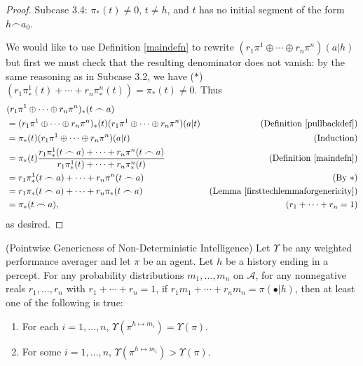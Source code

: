 \documentclass[runningheads]{llncs}
\begin{document}
\begin{proof}
    Subcase 3.4: $\pi_*(t)\not=0$, $t\not=h$, and $t$ has no initial segment
        of the form $h\frown a_0$.

    We would like to use Definition \ref{maindefn} to rewrite
    $(r_1\pi^1\oplus\cdots\oplus r_n\pi^n)(a|h)$ but first we must
    check that the resulting denominator does not vanish:
    by the same reasoning as in Subcase 3.2, we have
    ($*$) $(r_1\pi^1_*(t)+\cdots+r_n\pi^n_*(t))=\pi_*(t)\not=0$.
    Thus
    \begin{align*}
        &{} (r_1\pi^1\oplus\cdots\oplus r_n\pi^n)_*(t\frown a)\\
            &= (r_1\pi^1\oplus\cdots\oplus r_n\pi^n)_*(t)
                (r_1\pi^1\oplus\cdots\oplus r_n\pi^n)(a|t)
                    &\mbox{(Definition \ref{pullbackdef})}\\
            &= \pi_*(t)(r_1\pi^1\oplus\cdots\oplus r_n\pi^n)(a|t)
                    &\mbox{(Induction)}\\
            &= \pi_*(t)\frac{r_1\pi^1_*(t\frown a)+\cdots+r_n\pi^n(t\frown a)}
                {r_1\pi^1_*(t)+\cdots+r_n\pi^n_*(t)}
                    &\mbox{(Definition \ref{maindefn})}\\
            &= r_1\pi^1_*(t\frown a)+\cdots+r_n\pi^n(t\frown a)
                    &\mbox{(By $*$)}\\
            &= r_1\pi_*(t\frown a)+\cdots+r_n\pi_*(t\frown a)
                    &\mbox{(Lemma \ref{firsttechlemmaforgenericity})}\\
            &= \pi_*(t\frown a),
                    &\mbox{($r_1+\cdots+r_n=1$)}
    \end{align*}
    as desired.
\end{proof}

\begin{theorem}
\label{pointwisegenericnessthm}
    (Pointwise Genericness of Non-Deterministic Intelligence)
    Let $\Upsilon$ be any weighted performance averager and let
    $\pi$ be an agent.
    Let $h$ be a history ending in a percept.
    For any probability distributions $m_1,\ldots,m_n$ on $\mathcal A$,
    for any nonnegative reals $r_1,\ldots,r_n$ with $r_1+\cdots+r_n=1$,
    if $r_1m_1+\cdots+r_nm_n=\pi(\bullet|h)$,
    then at least one of the following is true:
    \begin{enumerate}
        \item For each $i=1,\ldots,n$, $\Upsilon(\pi^{h\mapsto m_i})=\Upsilon(\pi)$.
        \item For some $i=1,\ldots,n$, $\Upsilon(\pi^{h\mapsto m_i})>\Upsilon(\pi)$.
    \end{enumerate}
\end{theorem}
\end{document}
